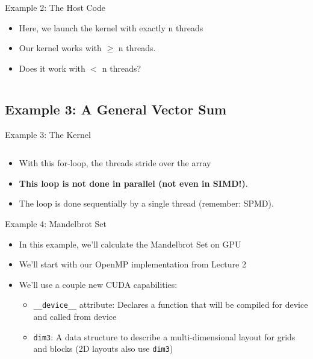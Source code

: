 \documentclass{beamer}
\begin{document}
    \begin{frame}{Example 2:  The Host Code}
        \begin{itemize}
            \item Here, we launch the kernel with exactly n threads
            \item Our kernel works with $\ge$ n threads.
            \item Does it work with $<$ n threads?
        \end{itemize}
        \begin{block}{}
            \inputminted[firstline=25,lastline=35]{cuda}{src/02_vector_add.cu}
        \end{block}
    \end{frame}

    \subsection{Example 3: A General Vector Sum}

    \begin{frame}{Example 3:  The Kernel}
        \begin{block}{}
            \inputminted[firstline=6,lastline=12]{cuda}{src/03_large_vector_add.cu}
        \end{block}
        \begin{itemize}
            \item With this for-loop, the threads stride over the array
            \item \textbf{This loop is not done in parallel (not even in SIMD!)}.
            \item The loop is done sequentially by a single thread (remember:  SPMD).
        \end{itemize}
    \end{frame}

    \begin{frame}{Example 4:  Mandelbrot Set}
        \begin{itemize}
            \item In this example, we'll calculate the Mandelbrot Set on GPU
            \item We'll start with our OpenMP implementation from Lecture 2
            \item We'll use a couple new CUDA capabilities:
            \begin{itemize}
                \item \texttt{\_\_device\_\_} attribute:  Declares a function
                      that will be compiled for device and called from device
                \item \texttt{dim3}: A data structure to describe a multi-dimensional layout for grids and blocks (2D layouts also use \texttt{dim3})
            \end{itemize}
        \end{itemize}
    \end{frame}
\end{document}
